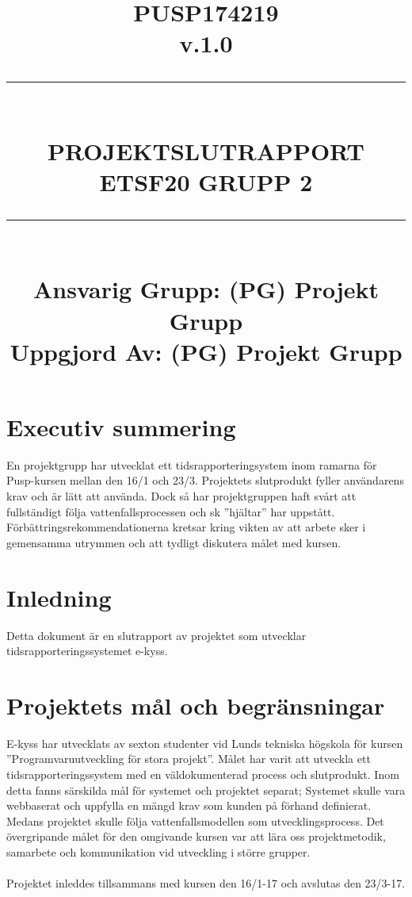 \documentclass[paper=a4, fontsize=11pt,twoside]{article}
\title{
		\documentNumber{#1}																						
		\documentVersion{#2}																				
		\HRule{0.5pt} \\ %
		\LARGE \textbf{\uppercase{#3}} \\
		\large \textbf{\uppercase{ETSF20 Grupp 2}} 
		\HRule{2pt} \\ [1.5cm]    
		\normalsize            
		\documentResponsible{#4} \\ 
		\documentCreator{#4}  
	}
\newcommand{\HRule}[1]{\rule{\linewidth}{#1}}
\newcommand{\documentNumber}[1]{\centering PUSP1742#1 \\[1.0cm]}
\newcommand{\documentVersion}[1]{\centering \small{v.#1} \\[1.0cm]}
\newcommand{\documentResponsible}[1]{\centering  Ansvarig Grupp: #1}
\newcommand{\documentCreator}[1]{\centering Uppgjord Av: #1}
\newcommand{\grouptitlepage}[4]{ 
	\title{
		\documentNumber{#1}																						
		\documentVersion{#2}																				
		\HRule{0.5pt} \\ %
		\LARGE \textbf{\uppercase{#3}} \\
		\large \textbf{\uppercase{ETSF20 Grupp 2}} 
		\HRule{2pt} \\ [1.5cm]    
		\normalsize            
		\documentResponsible{#4} \\ 
		\documentCreator{#4}  
	}																							
	\maketitle																							
	\thispagestyle{empty} 																					
	\newpage 
}
\begin{document}
\grouptitlepage
{19}
{1.0}
{Projektslutrapport}
{(PG) Projekt Grupp}
\tableofcontents

\section{Executiv summering}
En projektgrupp har utvecklat ett tidsrapporteringsystem inom ramarna för 
Pusp-kursen mellan den 16/1 och 23/3. Projektets slutprodukt fyller användarens 
krav och är lätt att använda. Dock så har projektgruppen haft svårt att
fullständigt följa vattenfallsprocessen och sk ”hjältar” har uppstått. 
Förbättringsrekommendationerna kretsar kring vikten av att arbete sker i 
gemensamma utrymmen och att tydligt diskutera målet med kursen.
\section{Inledning}
Detta dokument är en slutrapport av projektet som utvecklar
tidsrapporteringssystemet e-kyss.
\section{Projektets mål och begränsningar}
E-kyss har utvecklats av sexton studenter vid Lunds tekniska högskola för kursen 
”Programvaruutveckling för stora projekt”. Målet har varit att utveckla ett 
tidsrapporteringssystem med en väldokumenterad process och slutprodukt. 
Inom detta fanns särskilda mål för systemet och projektet separat; Systemet 
skulle vara webbaserat och uppfylla en mängd krav som kunden på förhand definierat. 
Medans projektet skulle följa vattenfallsmodellen som utvecklingsprocess.
Det övergripande målet för den omgivande kursen var att lära oss projektmetodik, 
samarbete och kommunikation vid utveckling i större grupper.\\
\\
Projektet inleddes tillsammans med kursen den 16/1-17 och avslutas den 23/3-17.
\newpage
\end{document}
